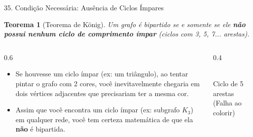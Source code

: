 \documentclass[9pt]{beamer}
\newtheorem{teorema}{Teorema}\usepackage{mathtools}
\begin{document}
    \begin{frame}{35. Condição Necessária: Ausência de Ciclos Ímpares}
        \begin{teorema}[Teorema de König]
            Um grafo é bipartido se e somente se ele \textbf{não possui nenhum ciclo de comprimento ímpar} (ciclos com 3, 5, 7... arestas).
        \end{teorema}
        \vspace{0.3cm}
        \begin{columns}
            \begin{column}{0.6\textwidth}
                \begin{itemize}
                    \item Se houvesse um ciclo ímpar (ex: um triângulo), ao tentar pintar o grafo com 2 cores, você inevitavelmente chegaria em dois vértices adjacentes que precisariam ter a mesma cor.
                    \item Assim que você encontra um ciclo ímpar (ex: subgrafo $K_3$) em qualquer rede, você tem certeza matemática de que ela \textbf{não} é bipartida.
                \end{itemize}
            \end{column}
            \begin{column}{0.4\textwidth}
                \centering
                \\
                \vspace{0.2cm}
                \tiny Ciclo de 5 arestas (Falha ao colorir)
            \end{column}
        \end{columns}
    \end{frame}
\end{document}
